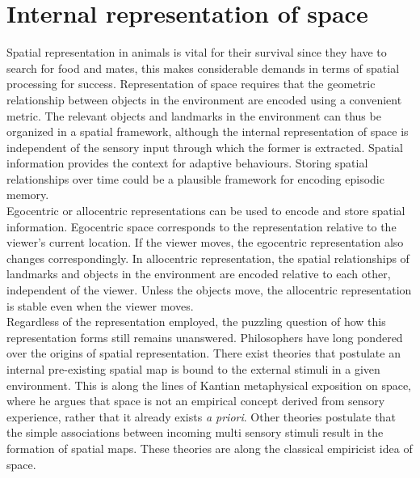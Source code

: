\section{Internal representation of space} 

\label{space} 


Spatial representation in animals is vital for their survival since they have to search for food and mates, this makes considerable demands in terms of spatial processing for success. Representation of space requires that the geometric relationship between objects in the environment are encoded using a convenient metric. The relevant objects and landmarks in the environment can thus be organized in a spatial framework, although the internal representation of space is independent of the sensory input through which the former is extracted. Spatial information provides the context for adaptive behaviours. Storing spatial relationships over time could be a plausible framework for encoding episodic memory. \\
Egocentric or allocentric representations can be used to encode and store spatial information. Egocentric space corresponds to the representation relative to the viewer's current location. If the viewer moves, the egocentric representation also changes correspondingly. In allocentric representation, the spatial relationships of landmarks and objects in the environment are encoded relative to each other, independent of the viewer. Unless the objects move, the allocentric representation is stable even when the viewer moves.\\
Regardless of the representation employed, the puzzling question of how this representation forms still remains unanswered. Philosophers have long pondered over the origins of spatial representation. There exist theories that postulate an internal pre-existing spatial map is bound to the external stimuli in a given environment. This is along the lines of Kantian metaphysical exposition on space, where he argues that space is not an empirical concept derived from sensory experience, rather that it already exists \emph{a priori}. Other theories postulate that the simple associations between incoming multi sensory stimuli result in the formation of spatial maps. These theories are along the classical empiricist idea of space. 

